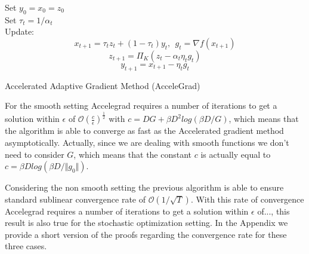 \documentclass[12pt]{article}
\theoremstyle{definition}
\begin{document}
\begin{algorithm}

    Set $y_0 = x_0 = z_0$ \\
      {
      	Set $\tau_t = 1/\alpha_t$ \\
      	Update:
			$$ x_{t+1} = \tau_t z_t + (1-\tau_t) y_t, \ \ g_t = \nabla f(x_{t+1}) $$
			$$ z_{t+1} = \Pi_K (z_t - \alpha_t \eta_t g_t) $$
			$$ y_{t+1} = x_{t+1} - \eta_t g_t $$
      }
    \caption{Accelerated Adaptive Gradient Method (AcceleGrad)}
    \label{alg:accelegrad-algo}
\end{algorithm}

\newpage

For the smooth setting Accelegrad requires a number of iterations to get a solution within $\epsilon$ of $\mathcal{O}(\frac{c}{\epsilon})^{\frac{1}{2}}$ with $c = DG + \beta D^2log(\beta D/G)$, which means that the algorithm is able to converge as fast as the Accelerated gradient method asymptotically. Actually, since we are dealing with smooth functions we don't need to consider $G$, which means that the constant $c$ is actually equal to $c = \beta D  log(\beta D /\Vert g_0 \Vert)$.

Considering the non smooth setting the previous algorithm is able to ensure standard sublinear convergence rate of $\mathcal{O}(1/\sqrt T)$. With this rate of convergence Accelegrad requires a number of iterations to get a solution within $\epsilon$ of..., this result is also true for the stochastic optimization setting. In the Appendix we provide a short version of the proofs regarding the convergence rate for these three cases. 




%
%
\end{document}
